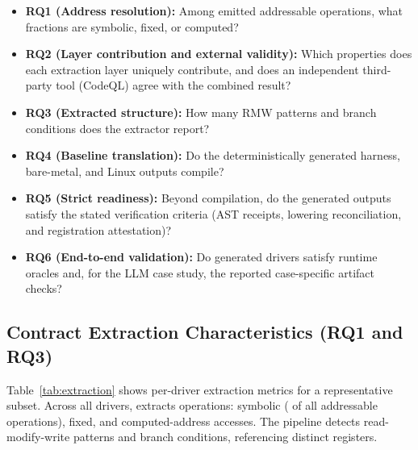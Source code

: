 \begin{itemize}
\item \textbf{RQ1 (Address resolution):} Among emitted addressable operations,
what fractions are symbolic, fixed, or computed?
\item \textbf{RQ2 (Layer contribution and external validity):} Which
properties does each extraction layer uniquely contribute, and does an
independent third-party tool (CodeQL) agree with the combined result?
\item \textbf{RQ3 (Extracted structure):} How many RMW patterns and branch
conditions does the extractor report?
\item \textbf{RQ4 (Baseline translation):} Do the deterministically generated
harness, bare-metal, and Linux outputs compile?
\item \textbf{RQ5 (Strict readiness):} Beyond compilation, do the generated
outputs satisfy the stated verification criteria (AST receipts, lowering
reconciliation, and registration attestation)?
\item \textbf{RQ6 (End-to-end validation):} Do generated drivers satisfy
runtime oracles and, for the LLM case study, the reported case-specific artifact
checks?
\end{itemize}

\subsection{Contract Extraction Characteristics (RQ1 and RQ3)}

Table~\ref{tab:extraction} shows per-driver extraction metrics for a
representative subset. Across all \EvalDrivers{} drivers, \reharness{}
extracts \EvalOps{} operations: \EvalSymbolic{} symbolic (\EvalSymbolicPct{}
of all addressable operations), \EvalFixed{} fixed, and \EvalComputed{}
computed-address accesses. The pipeline detects \EvalRMW{} read-modify-write
patterns and \EvalConditions{} branch conditions, referencing \EvalRegisters{}
distinct registers.

\begin{table}[t]
\centering
\caption{Extraction results for representative drivers. Sym = symbolic
addresses, Fixed = fixed offset, Comp = computed address, NAddr = non-address
operations (e.g., \texttt{DELAY}, \texttt{RETURN}), RMW = read-modify-
write, Cond = branch conditions, Regs = distinct registers. Sym+Fixed+Comp+NAddr
equals Ops in every row; \%Sym uses the addressable Sym+Fixed+Comp denominator.
The subset spans
the QEMU-validated drivers (ftgpio010, edu), the most condition-heavy driver
(virtio\_mmio), and the extremes of the symbolic-rate range; per-driver rows
for all \EvalDrivers{} drivers are in the versioned matrix artifact.}
\label{tab:extraction}
\resizebox{\columnwidth}{!}{\ExtractionResultsTable}
\end{table}

